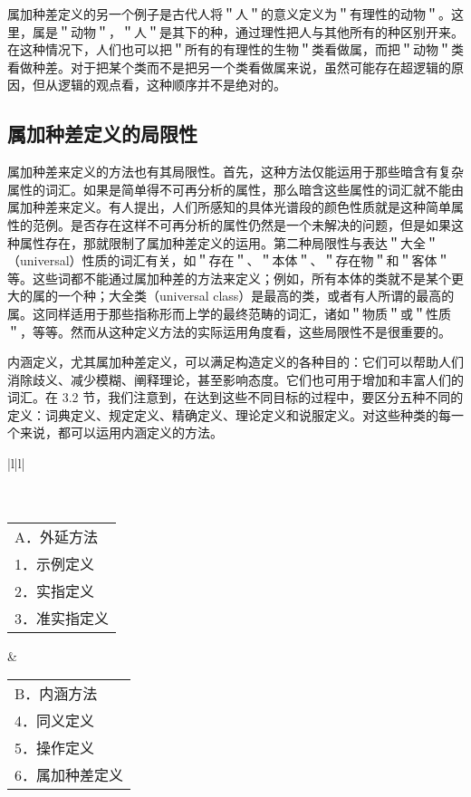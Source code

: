 属加种差定义的另一个例子是古代人将＂人＂的意义定义为＂有理性的动物＂。这里，属是＂动物＂，＂人＂是其下的种，通过理性把人与其他所有的种区别开来。在这种情况下，人们也可以把＂所有的有理性的生物＂类看做属，而把＂动物＂类看做种差。对于把某个类而不是把另一个类看做属来说，虽然可能存在超逻辑的原因，但从逻辑的观点看，这种顺序并不是绝对的。

\subsection{属加种差定义的局限性}

属加种差来定义的方法也有其局限性。首先，这种方法仅能运用于那些暗含有复杂属性的词汇。如果是简单得不可再分析的属性，那么暗含这些属性的词汇就不能由属加种差来定义。有人提出，人们所感知的具体光谱段的颜色性质就是这种简单属性的范例。是否存在这样不可再分析的属性仍然是一个未解决的问题，但是如果这种属性存在，那就限制了属加种差定义的运用。第二种局限性与表达＂大全＂（universal）性质的词汇有关，如＂存在＂、＂本体＂、＂存在物＂和＂客体＂等。这些词都不能通过属加种差的方法来定义；例如，所有本体的类就不是某个更大的属的一个种；大全类（universal class）是最高的类，或者有人所谓的最高的属。这同样适用于那些指称形而上学的最终范畴的词汇，诸如＂物质＂或＂性质＂，等等。然而从这种定义方法的实际运用角度看，这些局限性不是很重要的。

内涵定义，尤其属加种差定义，可以满足构造定义的各种目的：它们可以帮助人们消除歧义、减少模糊、阐释理论，甚至影响态度。它们也可用于增加和丰富人们的词汇。在 3.2 节，我们注意到，在达到这些不同目标的过程中，要区分五种不同的定义：词典定义、规定定义、精确定义、理论定义和说服定义。对这些种类的每一个来说，都可以运用内涵定义的方法。

\begin{center}
\begin{tabular}{|l|l|}
\hline
{} \\
\hline
{} \\
\hline
{} \\
\hline
\begin{tabular}{l}
A．外延方法 \\
1．示例定义 \\
2．实指定义 \\
3．准实指定义 \\
\end{tabular} & \begin{tabular}{l}
B．内涵方法 \\
4．同义定义 \\
5．操作定义 \\
6．属加种差定义 \\
\end{tabular} \\
\hline
\end{tabular}
\end{center}

